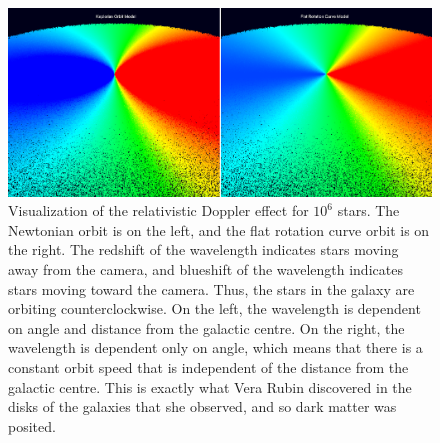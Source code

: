 \documentclass[12pt]{article}
\begin{document}
\begin{figure} 
\centering
\label{fig6}
  \includegraphics[width = 7 in]{doppler.png}
  \caption{
Visualization of the relativistic Doppler effect for $10^6$ stars.
The Newtonian orbit is on the left, and the flat rotation curve orbit is on the right.
The redshift of the wavelength indicates stars moving away from the camera, and blueshift of the wavelength indicates stars moving toward the camera.
Thus, the stars in the galaxy are orbiting counterclockwise.
On the left, the wavelength is dependent on angle and distance from the galactic centre.
On the right, the wavelength is dependent only on angle, which means that there is a constant orbit speed that is independent of the distance from the galactic centre.
This is exactly what Vera Rubin discovered in the disks of the galaxies that she observed, and so dark matter was posited.
}
\end{figure}
\end{document}
